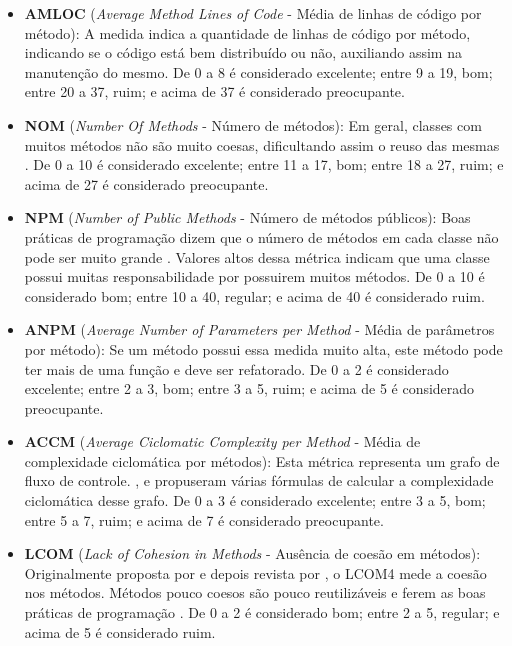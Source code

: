 \begin{itemize}
\item \textbf{AMLOC }(\textit{Average Method Lines of Code} - Média de linhas de código por método): A medida indica a quantidade de linhas de código por método, indicando se o código está bem distribuído ou não, auxiliando assim na manutenção do mesmo. De 0 a 8 é considerado excelente; entre 9 a 19, bom; entre 20 a 37, ruim; e acima de 37 é considerado preocupante.
\item \textbf{NOM }(\textit{Number Of Methods} - Número de métodos): Em geral, classes com muitos métodos não são muito coesas, dificultando assim o reuso das mesmas \cite{lorenzkidd}. De 0 a 10 é considerado excelente; entre 11 a 17, bom; entre 18 a 27, ruim; e acima de 27 é considerado preocupante.
\item \textbf{NPM }(\textit{Number of Public Methods} - Número de métodos públicos): Boas práticas de programação dizem que o número de métodos em cada classe não pode ser muito grande \cite{beck}. Valores altos dessa métrica indicam que uma classe possui muitas responsabilidade por possuirem muitos métodos. De 0 a 10 é considerado bom; entre 10 a 40, regular; e acima de 40 é considerado ruim.
\item \textbf{ANPM }(\textit{Average Number of Parameters per Method} - Média de parâmetros por método): Se um método possui essa medida muito alta, este método pode ter mais de uma função e deve ser refatorado. De 0 a 2 é considerado excelente; entre 2 a 3, bom; entre 3 a 5, ruim; e acima de 5 é considerado preocupante.
\item \textbf{ACCM }(\textit{Average Ciclomatic Complexity per Method} - Média de complexidade ciclomática por métodos): Esta métrica representa um grafo de fluxo de controle. ,  e  propuseram várias fórmulas de calcular a complexidade ciclomática desse grafo. De 0 a 3 é considerado excelente; entre 3 a 5, bom; entre 5 a 7, ruim; e acima de 7 é considerado preocupante.
\item \textbf{LCOM }(\textit{Lack of Cohesion in Methods} - Ausência de coesão em métodos): Originalmente proposta por  e depois revista por , o LCOM4 mede a coesão nos métodos. Métodos pouco coesos são pouco reutilizáveis e ferem as boas práticas de programação \cite{beck}. De 0 a 2 é considerado bom; entre 2 a 5, regular; e acima de 5 é considerado ruim.
\end{itemize}

